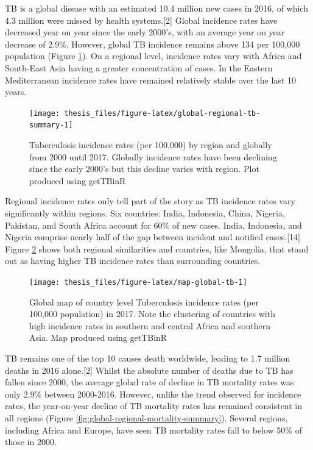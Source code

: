 \documentclass[11pt,twoside]{bristolthesis}
\begin{document}
  TB is a global disease with an estimated 10.4 million new cases in 2016, of which 4.3 million were missed by health systems.{[}2{]} Global incidence rates have decreased year on year since the early 2000's, with an average year on year decrease of 2.9\%. However, global TB incidence remains above 134 per 100,000 population (Figure \ref{fig:global-regional-tb-summary}). On a regional level, incidence rates vary with Africa and South-East Asia having a greater concentration of cases. In the Eastern Mediterranean incidence rates have remained relatively stable over the last 10 years.
  \begin{figure}
  
  {\centering \texttt{[image: thesis\_files/figure-latex/global-regional-tb-summary-1]} 
  
  }
  
  \caption{Tuberculosis incidence rates (per 100,000) by region and globally from 2000 until 2017. Globally incidence rates have been declining since the early 2000's but this decline varies with region. Plot produced using getTBinR}\label{fig:global-regional-tb-summary}
  \end{figure}
  Regional incidence rates only tell part of the story as TB incidence rates vary significantly within regions. Six countries: India, Indonesia, China, Nigeria, Pakistan, and South Africa account for 60\% of new cases. India, Indonesia, and Nigeria comprise nearly half of the gap between incident and notified cases.{[}14{]} Figure \ref{fig:map-global-tb} shows both regional similarities and countries, like Mongolia, that stand out as having higher TB incidence rates than surrounding countries.
  \begin{figure}
  
  {\centering \texttt{[image: thesis\_files/figure-latex/map-global-tb-1]} 
  
  }
  
  \caption{Global map of country level Tuberculosis incidence rates (per 100,000 population) in 2017. Note the clustering of countries with high incidence rates in southern and central Africa and southern Asia. Map produced using getTBinR}\label{fig:map-global-tb}
  \end{figure}
  TB remains one of the top 10 causes death worldwide, leading to 1.7 million deaths in 2016 alone.{[}2{]} Whilst the absolute number of deaths due to TB has fallen since 2000, the average global rate of decline in TB mortality rates was only 2.9\% between 2000-2016. However, unlike the trend observed for incidence rates, the year-on-year decline of TB mortality rates has remained consistent in all regions (Figure \ref{fig:global-regional-mortality-summary}). Several regions, including Africa and Europe, have seen TB mortality rates fall to below 50\% of those in 2000.
\end{document}

